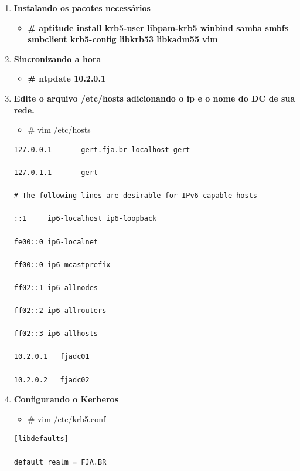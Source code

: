 \begin{enumerate}
	\item \textbf{Instalando os pacotes necessários}
\begin{itemize}
	\item \textbf{\# aptitude install krb5-user libpam-krb5 winbind samba smbfs smbclient krb5-config libkrb53 libkadm55 vim}
\end{itemize}

	\item \textbf{Sincronizando a hora}\\

\begin{itemize}
	\item \textbf{\# ntpdate 10.2.0.1} 
\end{itemize}

	\item \textbf{Edite o arquivo /etc/hosts adicionando o ip e o nome do DC de sua rede.}
	\begin{itemize}
			\item \# vim /etc/hosts\\
	\end{itemize}
		\begin{lstlisting}
127.0.0.1       gert.fja.br localhost gert

127.0.1.1       gert

# The following lines are desirable for IPv6 capable hosts

::1     ip6-localhost ip6-loopback

fe00::0 ip6-localnet

ff00::0 ip6-mcastprefix

ff02::1 ip6-allnodes

ff02::2 ip6-allrouters

ff02::3 ip6-allhosts

10.2.0.1   fjadc01

10.2.0.2   fjadc02

\end{lstlisting}

	\item \textbf{Configurando o Kerberos}
		\begin{itemize}
			\item {\# vim /etc/krb5.conf}\\
		\end{itemize}
		\begin{lstlisting}
[libdefaults]

default_realm = FJA.BR


\end{lstlisting}
\end{enumerate}
